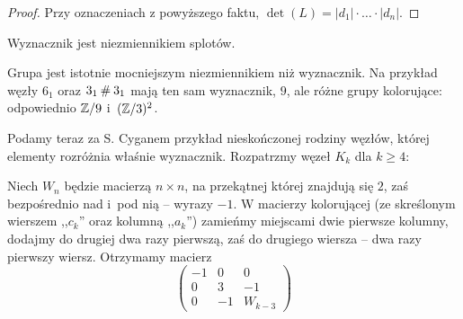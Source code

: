 \begin{proof}
    Przy oznaczeniach z powyższego faktu, $\det(L) = |d_1| \cdot \ldots \cdot |d_n|$.
\end{proof}

\begin{corollary}
%
\label{cor:determinant_invariant}%
    Wyznacznik jest niezmiennikiem splotów.
\end{corollary}

Grupa jest istotnie mocniejszym niezmiennikiem niż wyznacznik.
Na przykład węzły $6_1$ oraz $3_1 \mathbin{\#} 3_1$ mają ten sam wyznacznik, $9$, ale różne grupy kolorujące: odpowiednio $\mathbb Z/9$ i~$(\mathbb Z/3)^2$.

Podamy teraz za S. Cyganem przykład nieskończonej rodziny węzłów,
której elementy rozróżnia właśnie wyznacznik.
Rozpatrzmy węzeł $K_k$ dla $k \ge 4$:
\begin{comment}
\begin{tikzpicture}[baseline=-0.65ex, scale=0.1]
\begin{knot}[clip width=5, end tolerance=1pt, flip crossing/.list={1,2,3,6}]
    \strand[semithick] (-10, +3) .. controls (-4, +3) and (-4, -3) .. (0, -3);
    \strand[semithick] (-10, -3) .. controls (-4, -3) and (-4, +3) .. (0, +3);
    \node at (5, 0) {$\ldots$};
    \strand[semithick] (10+10, +3) .. controls (10+ 4, +3) and (10+ 4, -3) .. (10+0, -3);
    \strand[semithick] (10+ 10, -3) .. controls (10+ 4, -3) and (10+4, +3) .. (10+0, +3);
    \strand[semithick] (20+10, +3) .. controls (20+ 4, +3) and (20+ 4, -3) .. (20+0, -3);
\strand[semithick] (20+ 10, -3) .. controls (20+ 4, -3) and (20+4, +3) .. (20+0, +3);
    \strand[semithick] (30, 3) [in=up, out=right] to (35, -3);
    \strand[semithick,  ] (30, -3) [in=down, out=right] to (35, 3);
    \strand[semithick] (35, 3) [in=right, out=up] to (0, 10);
    \strand[semithick] (35, -3) [in=right, out=down] to (0, -10);
    \strand[semithick] (-10, -3) [in=down, out=left] to (-20, 0) to [in=left, out=up] (-10, 3);
    \strand[semithick] (-15, 5) [in=left, out=up] to (0, 10);
    \strand[semithick] (-15, 5) to (-15, -5) [in=left, out=down] to (0, -10);
    \node at (-5, -5) {$c_3$};
    \node at (15, -5) {$c_{k-2}$};
    \node at (25, -5) {$c_{k-1}$};
\end{knot}
\end{tikzpicture}
\end{comment}

Niech $W_n$ będzie macierzą $n \times n$, na przekątnej której znajdują się $2$, zaś bezpośrednio nad i~pod nią -- wyrazy $-1$.
W macierzy kolorującej (ze skreślonym wierszem ,,$c_k$'' oraz kolumną ,,$a_k$'') zamieńmy miejscami dwie pierwsze kolumny, dodajmy do drugiej dwa razy pierwszą, zaś do drugiego wiersza -- dwa razy pierwszy wiersz.
Otrzymamy macierz
\begin{equation}
    \begin{pmatrix}
        -1 & 0 & 0 \\
        0 & 3 & -1 \\
        0 & -1 & W_{k-3}
    \end{pmatrix}
\end{equation}


